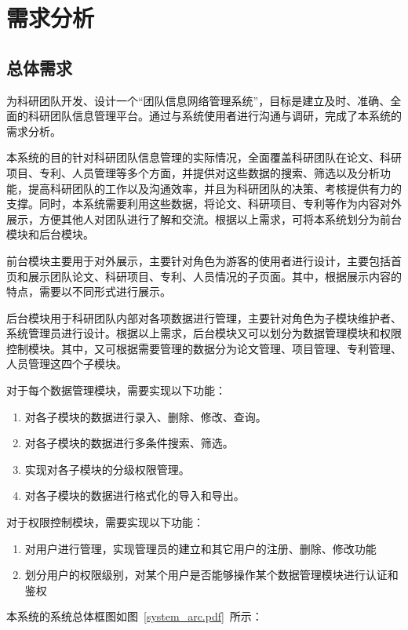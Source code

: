 \chapter{需求分析}
\section{总体需求}
为科研团队开发、设计一个“团队信息网络管理系统”，目标是建立及时、准确、全面的科研团队信息管理平台。通过与系统使用者进行沟通与调研，完成了本系统的需求分析。

本系统的目的针对科研团队信息管理的实际情况，全面覆盖科研团队在论文、科研项目、专利、人员管理等多个方面，并提供对这些数据的搜索、筛选以及分析功能，提高科研团队的工作以及沟通效率，并且为科研团队的决策、考核提供有力的支撑。同时，本系统需要利用这些数据，将论文、科研项目、专利等作为内容对外展示，方便其他人对团队进行了解和交流。根据以上需求，可将本系统划分为前台模块和后台模块。

前台模块主要用于对外展示，主要针对角色为游客的使用者进行设计，主要包括首页和展示团队论文、科研项目、专利、人员情况的子页面。其中，根据展示内容的特点，需要以不同形式进行展示。

后台模块用于科研团队内部对各项数据进行管理，主要针对角色为子模块维护者、系统管理员进行设计。根据以上需求，后台模块又可以划分为数据管理模块和权限控制模块。其中，又可根据需要管理的数据分为论文管理、项目管理、专利管理、人员管理这四个子模块。

对于每个数据管理模块，需要实现以下功能：

\begin{enumerate}
\item 对各子模块的数据进行录入、删除、修改、查询。
\item 对各子模块的数据进行多条件搜索、筛选。
\item 实现对各子模块的分级权限管理。
\item 对各子模块的数据进行格式化的导入和导出。
\end{enumerate}

对于权限控制模块，需要实现以下功能：

\begin{enumerate}
\item 对用户进行管理，实现管理员的建立和其它用户的注册、删除、修改功能
\item 划分用户的权限级别，对某个用户是否能够操作某个数据管理模块进行认证和鉴权
\end{enumerate}

本系统的系统总体框图如图~\ref{system_arc.pdf}~所示：

